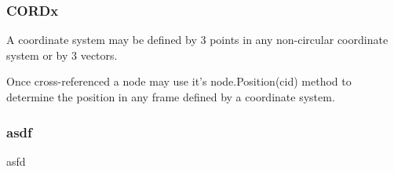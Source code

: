         
  \subsubsection{CORDx}
     A coordinate system may be defined by 3 points in any non-circular
     coordinate system or by 3 vectors.
     
     Once cross-referenced a node may use it's node.Position(cid) method to
     determine the position in any frame defined by a coordinate system.
  
  \subsubsection{asdf}
     asfd

